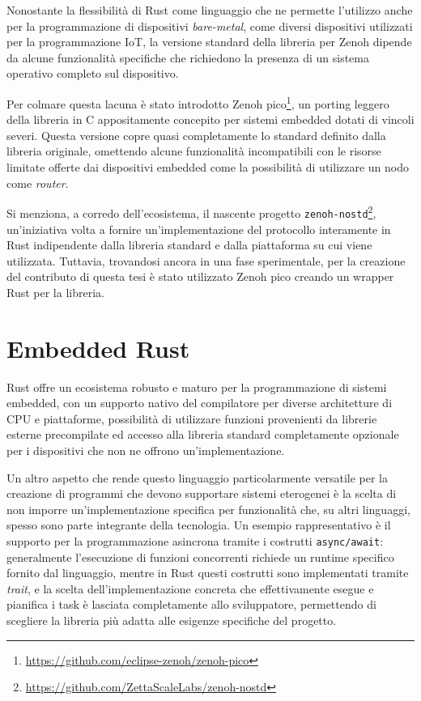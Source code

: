Nonostante la flessibilità di Rust come linguaggio che ne permette l'utilizzo
anche per la programmazione di dispositivi \emph{bare-metal}, come diversi dispositivi
utilizzati per la programmazione \ac{IoT}, la versione standard della libreria per
Zenoh dipende da alcune funzionalità specifiche che richiedono la presenza di un
sistema operativo completo sul dispositivo.

Per colmare questa lacuna è stato introdotto Zenoh pico\footnote{\url{https://github.com/eclipse-zenoh/zenoh-pico}},
un porting leggero della libreria in C appositamente concepito per sistemi embedded
dotati di vincoli severi.
Questa versione copre quasi completamente lo standard definito dalla libreria originale,
omettendo alcune funzionalità incompatibili con le risorse limitate offerte dai
dispositivi embedded come la possibilità di utilizzare un nodo come \emph{router}.

Si menziona, a corredo dell'ecosistema, il nascente progetto
\texttt{zenoh-nostd}\footnote{\url{https://github.com/ZettaScaleLabs/zenoh-nostd}},
un'iniziativa volta a fornire un'implementazione del protocollo interamente in Rust
indipendente dalla libreria standard e dalla piattaforma su cui viene utilizzata.
Tuttavia, trovandosi ancora in una fase sperimentale, per la creazione del contributo
di questa tesi è stato utilizzato Zenoh pico creando un wrapper Rust per la libreria.

\section{Embedded Rust}
\label{ssec:embedded-rust}

Rust offre un ecosistema robusto e maturo per la programmazione di sistemi embedded,
con un supporto nativo del compilatore per diverse architetture di CPU e piattaforme,
possibilità di utilizzare funzioni provenienti da librerie esterne precompilate
ed accesso alla libreria standard completamente opzionale per i dispositivi
che non ne offrono un'implementazione.

Un altro aspetto che rende questo linguaggio particolarmente versatile per la creazione di
programmi che devono supportare sistemi eterogenei è la scelta di
non imporre un'implementazione specifica per funzionalità che, su altri
linguaggi, spesso sono parte integrante della tecnologia.
Un esempio rappresentativo è il supporto per la programmazione
asincrona tramite i costrutti \texttt{async/await}: generalmente l'esecuzione di
funzioni concorrenti richiede un runtime specifico fornito dal linguaggio, mentre
in Rust questi costrutti sono implementati tramite \emph{trait}, e la scelta
dell'implementazione concreta che effettivamente esegue e pianifica i task è
lasciata completamente allo sviluppatore, permettendo di scegliere la libreria
più adatta alle esigenze specifiche del progetto.

